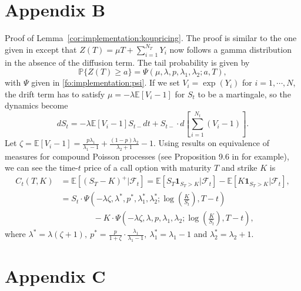 \documentclass{article}
\numberwithin{equation}{section}
\newcommand\EE {\mathbb E}
\newcommand\PP {\mathbb P}
\def\bone{\mathbf{1}}
\begin{document}
\section{Appendix B}
Proof of Lemma~\ref{cor:implementation:koupricing}.
The proof is similar to the one given in \cite{Kou2002model} except that $Z(T) = \mu T + \sum_{i=1}^{N_T} Y_i$ now follows a gamma distribution in the absence of the diffusion term.  The tail probability is given by 
$$
\PP\{Z(T) \geq a\} = \Psi(\mu, \lambda, p, \lambda_1, \lambda_2; a, T),
$$
with $\Psi$ given in \eqref{fo:implementation:psi}.
If we set $V_i = \exp(Y_i)$ for $i = 1,\cdots,N$, the drift term has to satisfy $\mu = - \lambda\EE[V_i-1]$ for $S_t$ to be a martingale, so the dynamics become
\begin{equation*}
d S_t = - \lambda\EE[V_i-1] S_{t-} dt + S_{t-} \cdot d\left[\sum_{i=1}^{N_t}(V_i-1)\right].
\end{equation*}
Let $\zeta = \EE[V_i-1] = \frac{p\lambda_1}{\lambda_1 - 1} + \frac{(1-p) \lambda_2}{\lambda_2+1} - 1$.  Using results on equivalence of measures for compound Poisson processes (see Proposition 9.6 in \cite{Cont2004financialmodeling} for example), we can see the time-$t$ price of a call option with maturity $T$ and strike $K$ is
\begin{align*}
C_t(T,K) & = \EE[(S_T - K)^+|\mathcal{F}_t] = \EE[S_T \bone_{S_T>K}|\mathcal{F}_t] - \EE[K \bone_{S_T>K}|\mathcal{F}_t], \\
& = S_t \cdot \Psi \left( - \lambda \zeta, \lambda^*, p^*, \lambda^*_1, \lambda^*_2; \log(\frac{K}{S_t}), T-t \right) \\
& \qquad \qquad - K \cdot \Psi \left( - \lambda \zeta, \lambda, p, \lambda_1, \lambda_2; \log(\frac{K}{S_t}), T-t \right),
\end{align*}
where $\lambda^* = \lambda(\zeta+1), \ p^* = \frac{p}{1+\zeta}\cdot\frac{\lambda_1}{\lambda_1-1}, \ \lambda_1^* = \lambda_1-1$ and $\lambda_2^* = \lambda_2+1$. 




\section{Appendix C}
\end{document}
